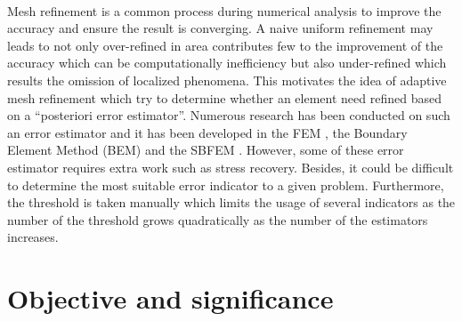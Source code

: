 \paragraph{}
Mesh refinement is a common process during numerical analysis to improve the accuracy and ensure the result is converging.
A naive uniform refinement may leads to not only over-refined in area contributes few to the improvement of the accuracy which can be computationally inefficiency but also under-refined which results the omission of localized phenomena.
This motivates the idea of adaptive mesh refinement which try to determine whether an element need refined based on a ``posteriori error estimator''.
Numerous research has been conducted on such an error estimator and it has been developed in the FEM \citep{Duval2018, doi:10.1002/gamm.201490020,PRUDHOMME20091887}, the Boundary Element Method (BEM) \citep{Zhao1998, Guiggiani1990, KAMIYA1992223} and the SBFEM \citep{NME:NME439}.
However, some of these error estimator requires extra work such as stress recovery.
Besides, it could be difficult to determine the most suitable error indicator to a given problem.
Furthermore, the threshold is taken manually which limits the usage of several indicators as the number of the threshold grows quadratically as the number of the estimators increases.



\section{Objective and significance}

